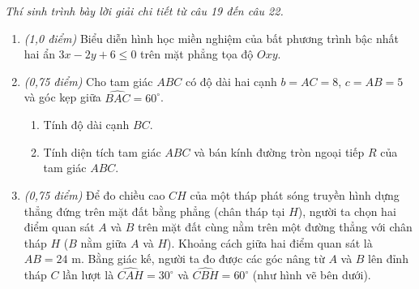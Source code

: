 \documentclass[12pt,a4paper]{article}
\newcommand{\parttitle}[1]{\par\vspace{2pt}{\large\bfseries\color{ink}#1}\par\vspace{1pt}}
\begin{document}
\parttitle{PHẦN IV. Tự luận}
\textit{Thí sinh trình bày lời giải chi tiết từ câu 19 đến câu 22.}
\begin{enumerate}[resume]
\item \textit{(1,0 điểm)} Biểu diễn hình học miền nghiệm của bất phương trình bậc nhất hai ẩn $3x - 2y + 6 \le 0$ trên mặt phẳng tọa độ $Oxy$.

\item \textit{(0,75 điểm)} Cho tam giác $ABC$ có độ dài hai cạnh $b = AC = 8$, $c = AB = 5$ và góc kẹp giữa $\widehat{BAC} = 60^\circ$.
\begin{enumerate}
    \item Tính độ dài cạnh $BC$.
    \item Tính diện tích tam giác $ABC$ và bán kính đường tròn ngoại tiếp $R$ của tam giác $ABC$.
\end{enumerate}

\item \textit{(0,75 điểm)} Để đo chiều cao $CH$ của một tháp phát sóng truyền hình dựng thẳng đứng trên mặt đất bằng phẳng (chân tháp tại $H$), người ta chọn hai điểm quan sát $A$ và $B$ trên mặt đất cùng nằm trên một đường thẳng với chân tháp $H$ ($B$ nằm giữa $A$ và $H$). Khoảng cách giữa hai điểm quan sát là $AB = 24\text{ m}$. Bằng giác kế, người ta đo được các góc nâng từ $A$ và $B$ lên đỉnh tháp $C$ lần lượt là $\widehat{CAH} = 30^\circ$ và $\widehat{CBH} = 60^\circ$ (như hình vẽ bên dưới).

\begin{center}
\end{center}
\end{enumerate}
\end{document}
